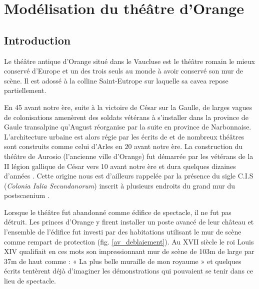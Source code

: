 \part{Modélisation du théâtre d’Orange}

	\chapter*{Introduction}
	 
			 Le théâtre antique d'Orange situé dans le Vaucluse est le théâtre romain le mieux conservé d'Europe et un des trois seuls au monde à avoir conservé son mur de scène. Il est adossé à la colline Saint-Eutrope sur laquelle sa \gls{cavea} repose partiellement.
			 
			 En 45 avant notre ère, suite à la victoire de César sur la Gaulle, de larges vagues de colonisations amenèrent des soldats vétérans à s'installer dans la province de Gaule transalpine qu'August réorganise par la suite en province de Narbonnaise. L'architecture urbaine est alors régie par les écrits de \cite{vitruve} et de nombreux théâtres sont construits comme celui d'Arles en 20 avant notre ère. La construction du théâtre de Aurosio (l'ancienne ville d'Orange) fut démarrée par les vétérans de la II légion gallique de César vers 10 avant notre ère et dura quelques dizaines d'années \citep{PouvoirDuTheatre}. Cette origine nous est d'ailleurs rappelée par la présence du sigle C.I.S (\textit{Colonia Iulia Secundanorum}) inscrit à plusieurs endroits du grand mur du \gls{postscaenium} \cite{formige}. 
			 
			 Lorsque le théâtre fut abandonné comme édifice de spectacle, il ne fut pas détruit. Les princes d'Orange y firent installer un poste avancé de leur château et l’ensemble de l’édifice fut investi par des habitations utilisant le mur de scène comme rempart de protection (fig. \ref{av_deblaiement}). Au XVII siècle le roi Louis XIV qualifiait en ces mots son impressionnant mur de scène de 103m de large par 37m de haut comme : « La plus belle muraille de mon royaume » et quelques écrits tentèrent déjà d'imaginer les démonstrations qui pouvaient se tenir dans ce lieu de spectacle. 
			 
